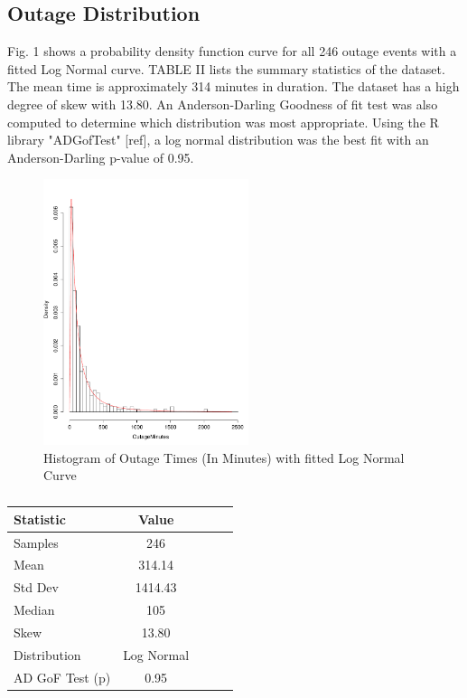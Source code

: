\documentclass[conference]{IEEEtran}
\begin{document}
\subsection{Outage Distribution}

Fig. 1 shows a probability density function curve for all 246 outage events with a fitted Log Normal curve. 
TABLE II lists the summary statistics of the dataset. The mean time is approximately 314 minutes in duration. The dataset has a high degree of skew with 13.80. An Anderson-Darling Goodness of fit test was also computed to determine which distribution was most appropriate. Using the R library "ADGofTest" [ref], a log normal distribution was the best fit with an Anderson-Darling  p-value of 0.95.

\begin{figure}
\begin{center}
\includegraphics[width=6cm]{graph1.pdf} 
\caption{ Histogram of Outage Times (In Minutes) with fitted Log Normal Curve}
\end{center}
\label{fig:outagedistribution}
\end{figure}


\begin {table}
\caption {}
\begin{center}
\begin{tabular}{l*{3}{c}r} Statistic & Value 
\\ \hline Samples & 246
\\ Mean & 314.14
\\ Std Dev & 1414.43
\\ Median & 105
\\ Skew & 13.80
\\ Distribution & Log Normal
\\AD GoF Test (p) & 0.95
\end{tabular}
\end{center}
\end{table}
\end{document}
